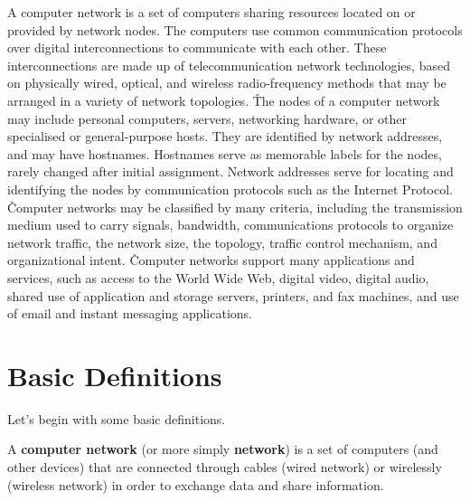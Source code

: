 A computer network is a set of computers sharing resources located on or provided by network nodes. The computers use
common communication protocols over digital interconnections to communicate with each other. These interconnections
are made up of telecommunication network technologies, based on physically wired, optical, and wireless
radio-frequency methods that may be arranged in a variety of network topologies. \v

The nodes of a computer network may include personal computers, servers, networking hardware, or other specialised or
general-purpose hosts. They are identified by network addresses, and may have hostnames. Hostnames serve as memorable
labels for the nodes, rarely changed after initial assignment. Network addresses serve for locating and identifying
the nodes by communication protocols such as the Internet Protocol. \v

Computer networks may be classified by many criteria, including the transmission medium used to carry signals,
bandwidth, communications protocols to organize network traffic, the network size, the topology, traffic control
mechanism, and organizational intent. \v

Computer networks support many applications and services, such as access to the World Wide Web, digital video,
digital audio, shared use of application and storage servers, printers, and fax machines, and use of email and
instant messaging applications.

\section{Basic Definitions}

Let's begin with some basic definitions.

A \textbf{computer network} (or more simply \textbf{network}) is a set of computers (and other devices) that are
connected through cables (wired network) or wirelessly (wireless network) in order to exchange data and share
information.
\ed

